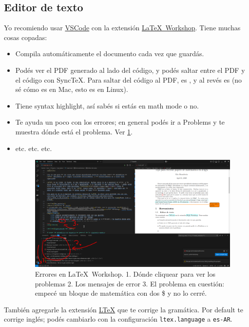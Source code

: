 \documentclass{article}
\begin{document}
\subsection{Editor de texto}
Yo recomiendo usar \href{https://code.visualstudio.com/}{VSCode} con la extensión \href{https://marketplace.visualstudio.com/items?itemName=James-Yu.latex-workshop}{\LaTeX\ Workshop}. Tiene muchas cosas copadas:
\begin{itemize}
    \item Compila automáticamente el documento cada vez que guardás.
    \item Podés ver el PDF generado al lado del código, y podés saltar entre el PDF y el código con SyncTeX. Para saltar del código al PDF, es , y al revés es  (no sé cómo es en Mac, esto es en Linux).
    \item Tiene syntax highlight, así sabés si estás en math mode o no.
    \item Te ayuda un poco con los errores; en general podés ir a Problems y te muestra dónde está el problema. Ver \cref{fig:errores-en-latex-workshop}.
    \item etc. etc. etc.
    \begin{figure}[ht]
        \centering
        \includegraphics[width=\textwidth]{img/errores-en-latex-workshop.png}
        \caption{Errores en \LaTeX\ Workshop. 1. Dónde cliquear para ver los problemas 2. Los mensajes de error 3. El problema en cuestión: empecé un bloque de matemática con dos \$ y no lo cerré.}
        \label{fig:errores-en-latex-workshop}
    \end{figure}
\end{itemize}

También agregarle la extensión \href{https://marketplace.visualstudio.com/items?itemName=valentjn.vscode-ltex}{LTeX} que te corrige la gramática. Por default te corrige inglés; podés cambiarlo con la configuración \texttt{ltex.language} a \texttt{es-AR}.
\end{document}
